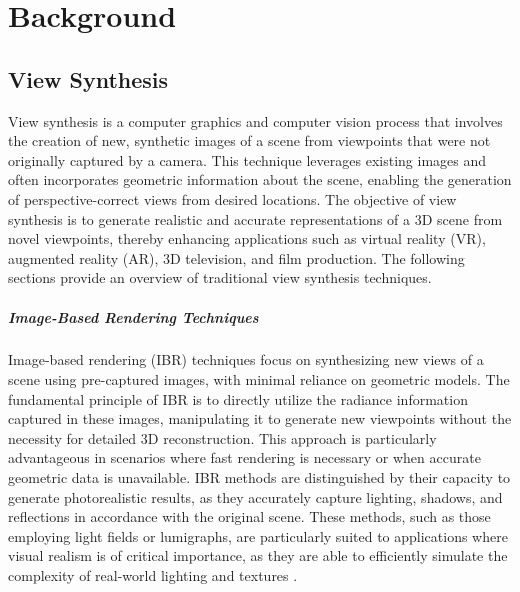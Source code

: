 %
\chapter{Background}
\label{sec:background}

\section{View Synthesis}

View synthesis is a computer graphics and computer vision process that involves the creation of new, synthetic images of a scene from viewpoints that were not originally captured by a camera. This technique leverages existing images and often incorporates geometric information about the scene, enabling the generation of perspective-correct views from desired locations.
The objective of view synthesis is to generate realistic and accurate representations of a 3D scene from novel viewpoints, thereby enhancing applications such as virtual reality (VR), augmented reality (AR), 3D television, and film production. The following sections provide an overview of traditional view synthesis techniques.

\paragraph{Image-Based Rendering Techniques}
Image-based rendering (IBR) techniques focus on synthesizing new views of a scene using pre-captured images, with minimal reliance on geometric models.
The fundamental principle of IBR is to directly utilize the radiance information captured in these images, manipulating it to generate new viewpoints without the necessity for detailed 3D reconstruction.
This approach is particularly advantageous in scenarios where fast rendering is necessary or when accurate geometric data is unavailable.
IBR methods are distinguished by their capacity to generate photorealistic results, as they accurately capture lighting, shadows, and reflections in accordance with the original scene.
These methods, such as those employing light fields or lumigraphs, are particularly suited to applications where visual realism is of critical importance, as they are able to efficiently simulate the complexity of real-world lighting and textures \cite{buehler_unstructured_2001,chen_view_1993,debevec_modeling_1996,gortler_lumigraph_1996,levoy_light_1996}.

